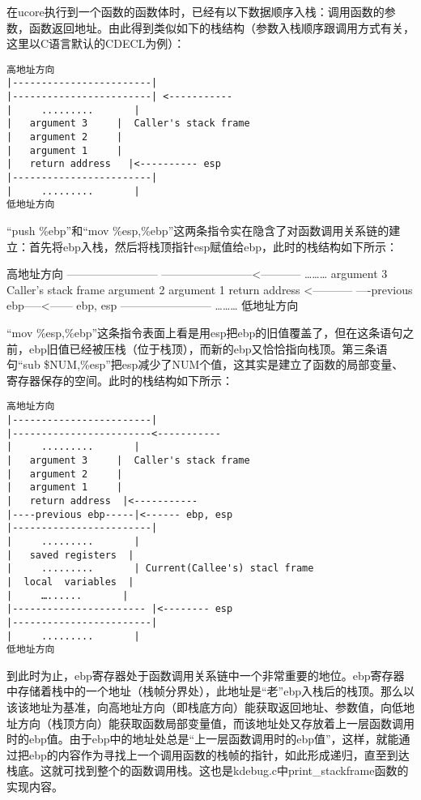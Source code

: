在ucore执行到一个函数的函数体时，已经有以下数据顺序入栈：调用函数的参数，函数返回地址。由此得到类似如下的栈结构（参数入栈顺序跟调用方式有关，
这里以C语言默认的CDECL为例）：

\begin{lstlisting}
高地址方向
|------------------------|
|------------------------| <-----------
|     .........       |
|   argument 3     |  Caller's stack frame
|   argument 2     |
|   argument 1     |
|   return address   |<---------- esp
|------------------------|
|     .........       |
低地址方向
\end{lstlisting}

``push \%ebp''和``mov
\%esp,\%ebp''这两条指令实在隐含了对函数调用关系链的建立：首先将ebp入栈，然后将栈顶指针esp赋值给ebp，此时的栈结构如下所示：

高地址方向 \textbar{}------------------------\textbar{}
\textbar{}------------------------\textless{}----------- \textbar{}
\ldots{}\ldots{}\ldots{} \textbar{} \textbar{} argument 3 \textbar{}
Caller's stack frame \textbar{} argument 2 \textbar{} \textbar{}
argument 1 \textbar{} \textbar{} return address
\textbar{}\textless{}----------- \textbar{}----previous
ebp-----\textbar{}\textless{}------ ebp, esp
\textbar{}------------------------\textbar{} \textbar{}
\ldots{}\ldots{}\ldots{} \textbar{} 低地址方向

``mov
\%esp,\%ebp''这条指令表面上看是用esp把ebp的旧值覆盖了，但在这条语句之前，ebp旧值已经被压栈（位于栈顶），而新的ebp又恰恰指向栈顶。第三条语句``sub
\$NUM,\%esp''把esp减少了NUM个值，这其实是建立了函数的局部变量、寄存器保存的空间。此时的栈结构如下所示：

\begin{lstlisting}
高地址方向
|------------------------|
|------------------------<-----------
|     .........       |
|   argument 3     |  Caller's stack frame
|   argument 2     |
|   argument 1     |
|   return address  |<-----------
|----previous ebp-----|<------ ebp, esp
|------------------------|
|     .........       |
|   saved registers  |
|     .........       | Current(Callee's) stacl frame
|  local  variables  |
|     …......       |
|----------------------- |<-------- esp
|------------------------|
|     .........       |
低地址方向
\end{lstlisting}

到此时为止，ebp寄存器处于函数调用关系链中一个非常重要的地位。ebp寄存器中存储着栈中的一个地址（栈帧分界处），此地址是``老''ebp入栈后的栈顶。那么以该该地址为基准，向高地址方向（即栈底方向）能获取返回地址、参数值，向低地址方向（栈顶方向）能获取函数局部变量值，而该地址处又存放着上一层函数调用时的ebp值。由于ebp中的地址处总是``上一层函数调用时的ebp值''，这样，就能通过把ebp的内容作为寻找上一个调用函数的栈帧的指针，如此形成递归，直至到达栈底。这就可找到整个的函数调用栈。这也是kdebug.c中print\_stackframe函数的实现内容。
